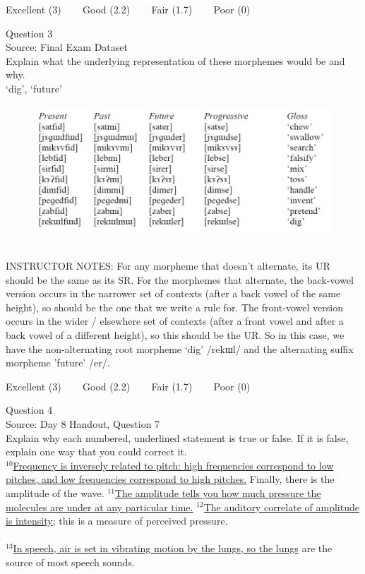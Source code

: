 \documentclass[12pt]{article}
\begin{document}
\vfill
Excellent (3) ~~~ Good (2.2) ~~~ Fair (1.7) ~~~ Poor (0)
\newpage

{\large Question 3}\\

Source: Final Exam Dataset\\

Explain what the underlying representation of these morphemes would be and why.\\

`dig', `future'

\begin{figure}[H]
\includegraphics{../images/final_dataset.png}
\end{figure}

~\\
INSTRUCTOR NOTES: For any morpheme that doesn’t alternate, its UR should be the same as its SR.  For the morphemes that alternate, the back-vowel version occurs in the narrower set of contexts (after a back vowel of the same height), so should be the one that we write a rule for. The front-vowel version occurs in the wider / elsewhere set of contexts (after a front vowel and after a back vowel of a different height), so this should be the UR. So in this case, we have the non-alternating root morpheme ‘dig’ /rekɯl/ and the alternating suffix morpheme 'future' /er/.


\vfill
Excellent (3) ~~~ Good (2.2) ~~~ Fair (1.7) ~~~ Poor (0)
\newpage

{\large Question 4}\\

Source: Day 8 Handout, Question 7\\

Explain why each numbered, underlined statement is true or false. If it is false, explain one way that you could correct it.\\

$^{10}$\ul{Frequency is inversely related to pitch: high frequencies correspond to low pitches, and low frequencies correspond to high pitches.} Finally, there is the amplitude of the wave. $^{11}$\ul{The amplitude tells you how much pressure the molecules are under at any particular time.} $^{12}$\ul{The auditory correlate of amplitude is intensity}; this is a measure of perceived pressure.\\\\$^{13}$\ul{In speech, air is set in vibrating motion by the lungs, so the lungs} are the source of most speech sounds.
\end{document}
